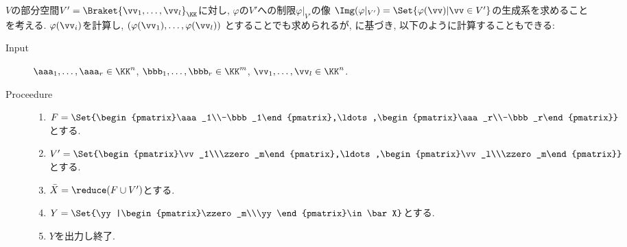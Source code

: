 $V$の部分空間$V'=\Braket{\vv_1,\ldots,\vv_l}_{\KK}$に対し,
$\varphi$の$V'$への制限$\varphi|_{V'}$の像
$\Img(\varphi|_{V'})=\Set{\varphi(\vv)|\vv\in V'}$の生成系を求めることを考える.
$\varphi(\vv_i)$を計算し,
$(\varphi(\vv_1),\ldots,\varphi(\vv_l))$
とすることでも求められるが,
に基づき,
以下のように計算することもできる:
\begin{algorithm}\makebox{}
\begin{description}
\item[Input]
$\aaa_1,\ldots,\aaa_r\in \KK^n$,
$\bbb_1,\ldots,\bbb_r\in \KK^m$,
$\vv_1,\ldots,\vv_l\in \KK^n$.
\item[Proceedure]\makebox{}
  \begin{enumerate}
  \item $F=\Set{\begin{pmatrix}\aaa_1\\-\bbb_1\end{pmatrix},\ldots,\begin{pmatrix}\aaa_r\\-\bbb_r\end{pmatrix}}$とする.
  \item $V'=\Set{\begin{pmatrix}\vv_1\\\zzero_m\end{pmatrix},\ldots,\begin{pmatrix}\vv_l\\\zzero_m\end{pmatrix}}$とする.
  \item $\bar X=\reduce(F\cup V')$とする.
  \item $Y=\Set{\yy|\begin{pmatrix}\zzero_m\\\yy\end{pmatrix}\in \bar X}$とする.
  \item $Y$を出力し終了.
  \end{enumerate}
\end{description}
\end{algorithm}

